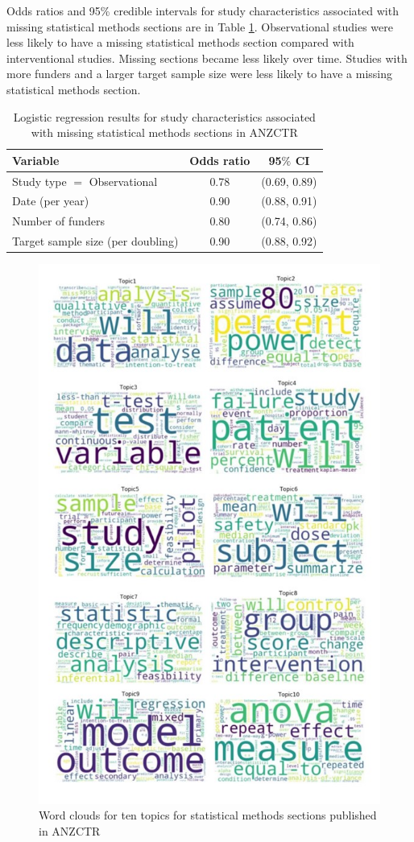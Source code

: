 \documentclass[12pt]{article}
\begin{document}
Odds ratios and 95\% credible intervals for study characteristics
associated with missing statistical methods sections are in Table
\ref{tab:anzctr-missing-odds}. Observational studies were less likely to
have a missing statistical methods section compared with interventional
studies. Missing sections became less likely over time. Studies with
more funders and a larger target sample size were less likely to have a
missing statistical methods section.

\begin{table}[]
\centering
\caption{Logistic regression results for study characteristics associated with missing statistical methods sections in ANZCTR}
\label{tab:anzctr-missing-odds}
\begin{tabular}{lcc}
\hline
Variable & Odds ratio & 95$\%$ CI \\
\hline
Study type $=$ Observational & 0.78 & (0.69, 0.89) \\
Date (per year) & 0.90 & (0.88, 0.91) \\
Number of funders & 0.80 & (0.74, 0.86) \\
Target sample size (per doubling) & 0.90 & (0.88, 0.92)\\
\hline
\end{tabular}
\end{table}

\begin{figure}
\centering 
\includegraphics[width=0.7\linewidth]{figures/anzctrwordclouds}
\caption{Word clouds for ten topics for statistical methods sections published in ANZCTR}\label{fig:anzctr-wordclouds}
\end{figure}
\end{document}
